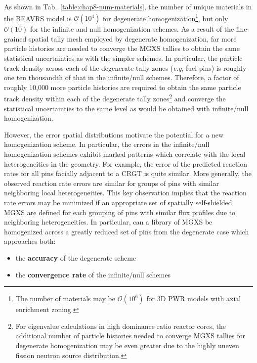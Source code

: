As shown in Tab.~\ref{table:chap8-num-materials}, the number of unique materials in the \ac{BEAVRS} model is $\mathcal{O}(10^{4})$ for degenerate homogenization\footnote{The number of materials may be $\mathcal{O}(10^{6})$ for 3D \ac{PWR} models with axial enrichment zoning.}, but only $\mathcal{O}(10)$ for the infinite and null homogenization schemes. As a result of the fine-grained spatial tally mesh employed by degenerate homogenization, far more particle histories are needed to converge the \ac{MGXS} tallies to obtain the same statistical uncertainties as with the simpler schemes. In particular, the particle track density across each of the degenerate tally zones (\textit{e.g}, fuel pins) is roughly one ten thousandth of that in the infinite/null schemes. Therefore, a factor of roughly 10,000 more particle histories are required to obtain the same particle track density within each of the degenerate tally zones\footnote{For eigenvalue calculations in high dominance ratio reactor cores, the additional number of particle histories needed to converge \ac{MGXS} tallies for degenerate homogenization may be even greater due to the highly uneven fission neutron source distribution.} and converge the statistical uncertainties to the same level as would be obtained with infinite/null homogenization.

However, the error spatial distributions motivate the potential for a new homogenization scheme. In particular, the errors in the infinite/null homogenization schemes exhibit marked patterns which correlate with the local heterogeneities in the geometry. For example, the error of the predicted reaction rates for all pins facially adjacent to a \ac{CRGT} is quite similar. More generally, the observed reaction rate errors are similar for groups of pins with similar neighboring local heterogeneities. This key observation implies that the reaction rate errors may be minimized if an appropriate set of spatially self-shielded \ac{MGXS} are defined for each grouping of pins with similar flux profiles due to neighboring heterogeneities. In particular, can a library of \ac{MGXS} be homogenized across a greatly reduced set of pins from the degenerate case which approaches both:

\begin{itemize}[noitemsep]
\item the \textbf{accuracy} of the degenerate scheme
\item the \textbf{convergence rate} of the infinite/null schemes
\end{itemize}

